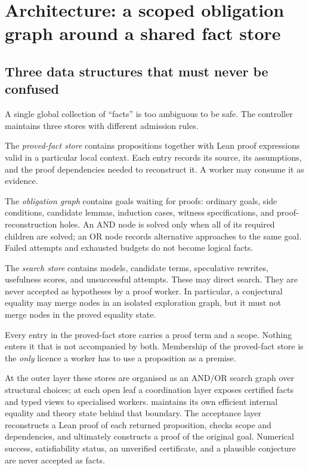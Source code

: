 \section{Architecture: a scoped obligation graph around a shared fact store}
\label{sec:architecture}

\subsection{Three data structures that must never be confused}

A single global collection of ``facts'' is too ambiguous to be safe. The
controller maintains three stores with different admission rules.

The \emph{proved-fact store} contains propositions together with Lean proof
expressions valid in a particular local context. Each entry records its
source, its assumptions, and the proof dependencies needed to reconstruct it.
A worker may consume it as evidence.

The \emph{obligation graph} contains goals waiting for proofs: ordinary goals,
side conditions, candidate lemmas, induction cases, witness specifications,
and proof-reconstruction holes. An AND node is solved only when all of its
required children are solved; an OR node records alternative approaches to the
same goal. Failed attempts and exhausted budgets do not become logical facts.

The \emph{search store} contains models, candidate terms, speculative
rewrites, usefulness scores, and unsuccessful attempts. These may direct
search. They are never accepted as hypotheses by a proof worker. In
particular, a conjectural equality may merge nodes in an isolated exploration
graph, but it must not merge nodes in the proved equality state.

\begin{invariant}
Every entry in the proved-fact store carries a proof term and a scope. Nothing
enters it that is not accompanied by both. Membership of the proved-fact store
is the \emph{only} licence a worker has to use a proposition as a premise.
\end{invariant}

At the outer layer these stores are organised as an AND/OR search graph over
structural choices; at each open leaf a coordination layer exposes certified
facts and typed views to specialised workers. \grind{} maintains its own
efficient internal equality and theory state behind that boundary. The
acceptance layer reconstructs a Lean proof of each returned proposition,
checks scope and dependencies, and ultimately constructs a proof of the
original goal. Numerical success, satisfiability status, an unverified
certificate, and a plausible conjecture are never accepted as facts.

